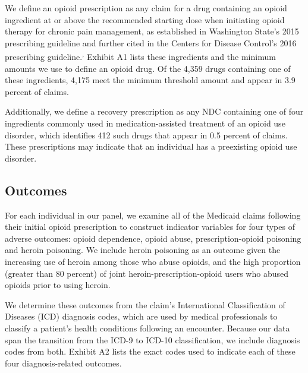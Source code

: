 \documentclass[11pt, letter]{article}
\begin{document}
We define an opioid prescription as any claim for a drug containing an opioid ingredient at or above the recommended starting dose when initiating opioid therapy for chronic pain management, as established in Washington State's 2015 prescribing guideline and further cited in the Centers for Disease Control's 2016 prescribing guideline.\textsuperscript{,} Exhibit A1 lists these ingredients and the minimum amounts we use to define an opioid drug. Of the 4,359 drugs containing one of these ingredients, 4,175 meet the minimum threshold amount and appear in 3.9 percent of claims.

Additionally, we define a recovery prescription as any NDC containing one of four ingredients commonly used in medication-assisted treatment of an opioid use disorder, which identifies 412 such drugs that appear in 0.5 percent of claims. These prescriptions may indicate that an individual has a preexisting opioid use disorder.

\subsection{Outcomes}

For each individual in our panel, we examine all of the Medicaid claims following their initial opioid prescription to construct indicator variables for four types of adverse outcomes: opioid dependence, opioid abuse, prescription-opioid poisoning and heroin poisoning. We include heroin poisoning as an outcome given the increasing use of heroin among those who abuse opioids, and the high proportion (greater than 80 percent) of joint heroin-prescription-opioid users who abused opioids prior to using heroin.

We determine these outcomes from the claim's International Classification of Diseases (ICD) diagnosis codes, which are used by medical professionals to classify a patient's health conditions following an encounter. Because our data span the transition from the ICD-9 to ICD-10 classification, we include diagnosis codes from both. Exhibit A2 lists the exact codes used to indicate each of these four diagnosis-related outcomes. 
\end{document}
